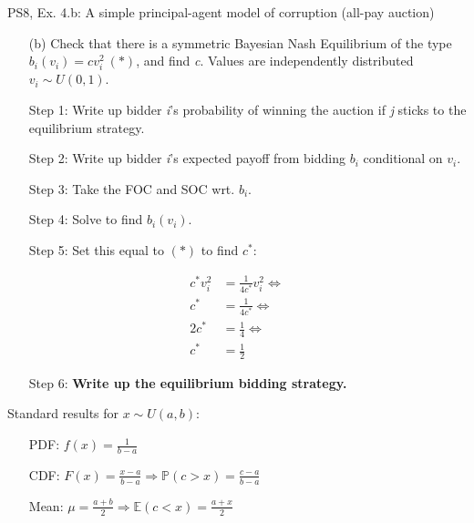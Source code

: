\begin{frame}{PS8, Ex. 4.b: A simple principal-agent model of corruption (all-pay auction)}
    \begin{itemize}
      \item[(b)] Check that there is a symmetric Bayesian Nash Equilibrium of the type $b_i(v_i) = cv_i^2\ (*)$, and find \textit{c}. Values are independently distributed $v_i\sim U(0, 1)$.
    \end{itemize} \vspace{-8pt}
    \begin{multicols}{2}
      \begin{itemize}
        \item[Step 1:] Write up bidder \textit{i}'s probability of winning the auction if \textit{j} sticks to the equilibrium strategy.
        \item[Step 2:] Write up bidder \textit{i}'s expected payoff from bidding $b_i$ conditional on $v_i$.
        \item[Step 3:] Take the FOC and SOC wrt. $b_i$.
        \item[Step 4:] Solve to find $b_i(v_i)$.
        \item[Step 5:] Set this equal to $(*)$ to find $c^*$:
      \end{itemize} \vspace{-6pt}
      \begin{align*}
        c^*v_i^2&=\frac{1}{4c^*}v_i^2\Leftrightarrow\\
        c^*&=\frac{1}{4c^*}\Leftrightarrow\\
        2c^*&=\frac{1}{4}\Leftrightarrow\\
        c^*&=\frac{1}{2}
      \end{align*} \vspace{-12pt}
      \begin{itemize}
        \item[Step 6:] \textbf{Write up the equilibrium bidding strategy.}
      \end{itemize}
      \vfill\null\columnbreak
      Standard results for $x\sim U(a, b):$ \vspace{-6pt}
      \begin{itemize}
        \item[PDF:] $f(x)=\frac{1}{b-a}$
        \item[CDF:] $F(x)=\frac{x-a}{b-a}\Rightarrow\mathbb{P}(c>x)=\frac{c-a}{b-a}$
        \item[Mean:] $\mu=\frac{a+b}{2}\Rightarrow\mathbb{E}(c<x)=\frac{a+x}{2}$

\end{itemize}
\end{multicols}
\end{frame}

